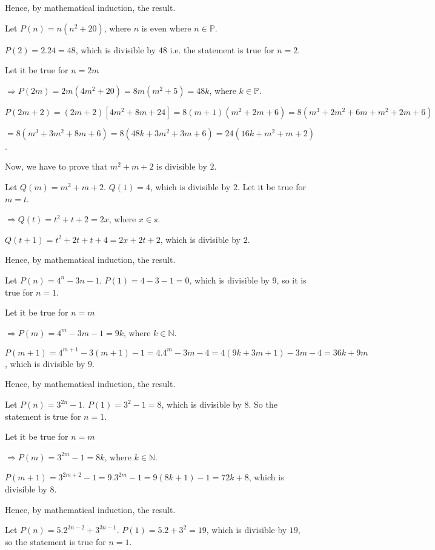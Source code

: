   Hence, by mathematical induction, the result.
\item Let $P(n) = n(n^2 + 20)$, where $n$ is even where $n\in\mathbb{P}$.

  $P(2) = 2.24 = 48$, which is divisible by $48$ i.e. the statement is true for $n = 2$.

  Let it be true for $n = 2m$

  $\Rightarrow P(2m) = 2m(4m^2 + 20) = 8m(m^2 + 5) = 48k$, where $k\in\mathbb{P}$.

  $P(2m + 2) = (2m + 2)\left[4m^2 + 8m + 24\right] = 8(m + 1)(m^2 + 2m + 6) = 8(m^3 + 2m^2 + 6m + m^2 + 2m +
  6)$

  $= 8(m^3 + 3m^2 + 8m + 6) = 8(48k + 3m^2 + 3m + 6) = 24(16k + m^2 + m + 2)$.

  Now, we have to prove that $m^2 + m + 2$ is divisible by $2$.

  Let $Q(m) = m^2 + m + 2$. $Q(1) = 4$, which is divisible by $2$. Let it be true for $m = t$.

  $\Rightarrow Q(t) = t^2 + t + 2 = 2x$, where $x\in\mathbb{x}$.

  $Q(t + 1) = t^2 + 2t + t + 4 = 2x + 2t + 2$, which is divisible by $2$.

  Hence, by mathematical induction, the result.
\item Let $P(n) = 4^n - 3n - 1$. $P(1) = 4 - 3 - 1 = 0$, which is divisible by $9$, so it is true for $n =
  1$.

  Let it be true for $n = m$

  $\Rightarrow P(m) = 4^m - 3m - 1 = 9k$, where $k\in\mathbb{N}$.

  $P(m + 1) = 4^{m + 1} - 3(m + 1) - 1 = 4.4^m - 3m - 4 = 4(9k + 3m + 1) -3m  - 4 = 36k + 9m$, which is
  divisible by $9$.

  Hence, by mathematical induction, the result.
\item Let $P(n) = 3^{2n} - 1$. $P(1) = 3^2 - 1 = 8$, which is divisible by $8$. So the statement is true for
  $n = 1$.

  Let it be true for $n = m$

  $\Rightarrow P(m) = 3^{2m} - 1 = 8k$, where $k\in\mathbb{N}$.

  $P(m + 1) = 3^{2m + 2} - 1 = 9.3^{2m} - 1 = 9(8k + 1) - 1 = 72k + 8$, which is divisible by $8$.

  Hence, by mathematical induction, the result.
\item Let $P(n) = 5.2^{3n - 2} + 3^{3n - 1}$. $P(1) = 5.2 + 3^2 = 19$, which is divisible by $19$, so the
  statement is true for $n = 1$.

